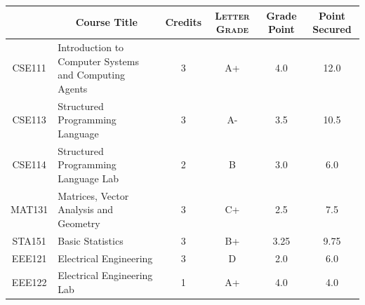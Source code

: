 \documentclass[11pt]{article}
\newcommand*{\numtwo}[1]{\pgfmathprintnumber[
                    fixed, precision=2, fixed zerofill=true]{#1}}
\begin{document}
                \begin{center}
                    \renewcommand{\arraystretch}{1.08}
                    
                \begin{tabular}{|c|l|c|>{\scshape}c|c|c|}
                \hline  \rule[-1ex]{0pt}{3.5ex} {\centering{\bf Course Code}} &  \multicolumn{1}{c|}{\textbf{Course Title}}  & {\bf Credits} & {\bf Letter Grade} & {\bf Grade Point} & {\bf Point Secured}  \\ 
                \hline   CSE111 &  Introduction to Computer Systems and Computing Agents		 & 3 & A+ & 4.0 & 12.0 \\ %
                \hline   CSE113 &  Structured Programming Language		 & 3 & A- & 3.5 & 10.5 \\ %
                \hline   CSE114 &  Structured Programming Language Lab		 & 2 & B & 3.0 & 6.0 \\ %
                \hline   MAT131 &  Matrices, Vector Analysis and Geometry		 & 3 & C+ & 2.5 & 7.5 \\ %
                \hline   STA151 &  Basic Statistics		 & 3 & B+ & 3.25 & 9.75 \\ %
                \hline   EEE121 &  Electrical Engineering		 & 3 & D & 2.0 & 6.0 \\ %
                \hline   EEE122 &  Electrical Engineering Lab		 & 1 & A+ & 4.0 & 4.0 \\ %

\hline                %
                \end{tabular}
                \end{center}
                \renewcommand{\arraystretch}{1.03}
\end{document}
